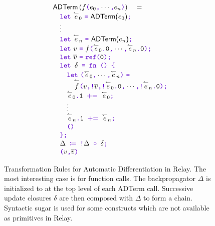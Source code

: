 \begin{figure}
{\begin{footnotesize}
\begin{minipage}{0.625\textwidth}
\[\begin{array}{lll}
  \end{array}
  \]
  \end{minipage}%
  \hfill\vline\hfill
  \begin{minipage}{0.4\textwidth}
  \[
  \begin{array}{l}
    \textsf{ADTerm}\left(f\rTuple{e_0}{\cdots}{e_n}\right) \ \ \  = \\
    \quad \rLet{\revv{e_0}}{}{\textsf{ADTerm($e_0$)}}{} \\
    \quad \vdots \\
    \quad \rLet{\revv{e_n}}{}{\textsf{ADTerm($e_n$)}}{} \\
    \quad \rLet{v}{}{f\rTuple{\revv{e_0}\kwd{.}\texttt{0}}{\cdots}{\revv{e_n}\kwd{.}\texttt{0}}}{} \\
    \quad \rLet{\bper{v}}{}{\kwd{ref(}\texttt{0}\kwd{)}}{} \\
    \quad \kwd{let } \delta \kwd{ = fn () \textbraceleft} \\
    \quad \quad \rLet{\rTuple{\sens{e_0}}{\cdots}{\sens{e_n}}}{}{\\ \quad \quad \quad \revv{f}\rTuple{v}{\kwd{!}\bper{v}}{\kwd{!}\revv{e_0}\kwd{.}\texttt{0}}{\cdots}{\kwd{!}\revv{e_n}\kwd{.}\texttt{0}}}{} \\
    \quad \quad \revv{e_0}\kwd{.}\texttt{1} \kwd{ $\pluseq$ } \sens{e_0} \kwd{;} \\
    \quad \quad \vdots \\
    \quad \quad \revv{e_n}\kwd{.}\texttt{1} \kwd{ $\pluseq$ } \sens{e_n} \kwd{;} \\
    \quad \quad \kwd{()} \\
    \quad \kwd{\textbraceright;} \\
    \quad \Delta \kwd{ $\coloneqq$ } \kwd{!}\Delta \kwd{ $\circ$ } \delta \kwd{;} \\
    \quad \rTuple{v}{\bper{v}}
  \end{array}
  \]
  \end{minipage}%
  \end{footnotesize}
  }
  \caption{
    Transformation Rules for Automatic Differentiation in Relay.
    The most interesting case is for function calls.
    The backpropagator $\Delta$ is initialized to  at the top level of each \textsf{ADTerm} call.
    Successive update closures $\delta$ are then composed with $\Delta$ to
      form a chain.
    Syntactic sugar is used for some constructs which are not available as
      primitives in Relay.
  }
  \label{fig:autodiff_rules}
\end{figure}

